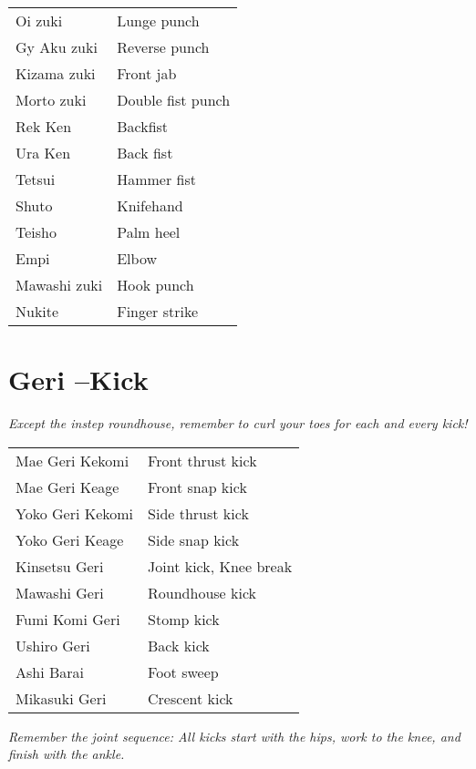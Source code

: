 \documentclass[11pt]{article}
\begin{document}
\begin{center}
\begin{tabular}{ll}
Oi zuki & Lunge punch\\
Gy Aku zuki & Reverse punch\\
Kizama zuki & Front jab\\
Morto zuki & Double fist punch\\
Rek Ken & Backfist\\
Ura Ken & Back fist\\
Tetsui & Hammer fist\\
Shuto & Knifehand\\
Teisho & Palm heel\\
Empi & Elbow\\
Mawashi zuki & Hook punch\\
Nukite & Finger strike\\
\end{tabular}
\end{center}

\section{Geri --Kick}
\label{sec:org628e439}

\begin{center}
\vspace{-1em}
\emph{Except the instep roundhouse, remember to curl your toes for each and every kick!}
\end{center}

\begin{center}
\begin{tabular}{ll}
Mae Geri Kekomi & Front thrust kick\\
Mae Geri Keage & Front snap kick\\
Yoko Geri Kekomi & Side thrust kick\\
Yoko Geri Keage & Side snap kick\\
Kinsetsu Geri & Joint kick, Knee break\\
Mawashi Geri & Roundhouse kick\\
Fumi Komi Geri & Stomp kick\\
Ushiro Geri & Back kick\\
Ashi Barai & Foot sweep\\
Mikasuki Geri & Crescent kick\\
\end{tabular}
\end{center}

\begin{center}
\vspace{-0.3em}
\emph{Remember the joint sequence: All kicks start with the hips, work to the knee, and finish with the ankle.}
\end{center}
\end{document}
